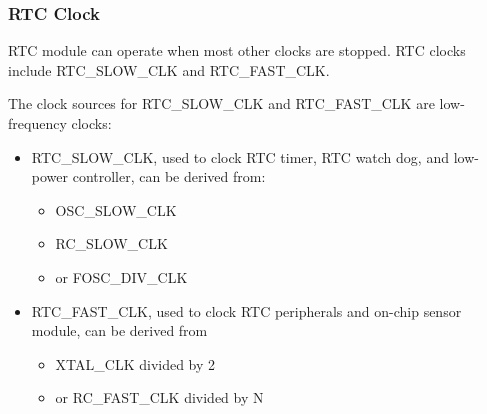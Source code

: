\documentclass[main\_\_EN.tex]{subfiles}
\begin{document}
\subsubsection{RTC Clock}

RTC module can operate when most other clocks are stopped. RTC clocks include RTC\_SLOW\_CLK and RTC\_FAST\_CLK.

The clock sources for RTC\_SLOW\_CLK and RTC\_FAST\_CLK are low-frequency clocks:

\begin{itemize}
    \item RTC\_SLOW\_CLK, used to clock RTC timer, RTC watch dog, and low-power controller, can be derived from:
    \begin{itemize}
        \item OSC\_SLOW\_CLK
        \item RC\_SLOW\_CLK
        \item or FOSC\_DIV\_CLK
    \end{itemize}
    \item RTC\_FAST\_CLK, used to clock RTC peripherals and on-chip sensor module, can be derived from
    \begin{itemize}
        \item XTAL\_CLK divided by 2
        \item or RC\_FAST\_CLK divided by N
    \end{itemize}
\end{itemize}
\end{document}
